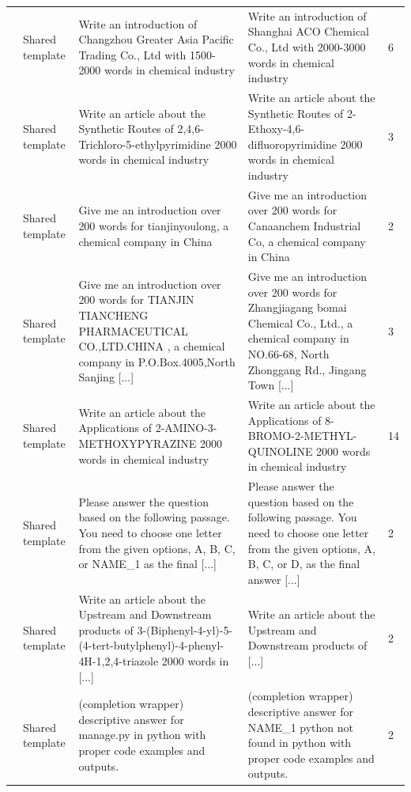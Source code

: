 {\begin{longtable}{@{}p{}p{}p{}p{}p{}@{}}
\addlinespace[3pt]
65 & Shared template & \raggedright Write an introduction of Changzhou Greater Asia Pacific Trading Co., Ltd with 1500-2000 words in chemical industry & \raggedright Write an introduction of Shanghai ACO Chemical Co., Ltd with 2000-3000 words in chemical industry & 6\\
\addlinespace[3pt]
81 & Shared template & \raggedright Write an article about the Synthetic Routes of 2,4,6-Trichloro-5-ethylpyrimidine 2000 words in chemical industry & \raggedright Write an article about the Synthetic Routes of 2-Ethoxy-4,6-difluoropyrimidine 2000 words in chemical industry & 3\\
\addlinespace[3pt]
133 & Shared template & \raggedright Give me an introduction over 200 words for tianjinyoulong, a chemical company in China & \raggedright Give me an introduction over 200 words for Canaanchem Industrial Co, a chemical company in China & 2\\
\addlinespace[3pt]
136 & Shared template & \raggedright Give me an introduction over 200 words for TIANJIN TIANCHENG PHARMACEUTICAL CO.,LTD.CHINA , a chemical company in P.O.Box.4005,North Sanjing [...] & \raggedright Give me an introduction over 200 words for Zhangjiagang bomai Chemical Co., Ltd., a chemical company in NO.66-68, North Zhonggang Rd., Jingang Town [...] & 3\\
\addlinespace[3pt]
149 & Shared template & \raggedright Write an article about the Applications of 2-AMINO-3-METHOXYPYRAZINE 2000 words in chemical industry & \raggedright Write an article about the Applications of 8-BROMO-2-METHYL-QUINOLINE 2000 words in chemical industry & 14\\
\addlinespace[3pt]
162 & Shared template & \raggedright Please answer the question based on the following passage. You need to choose one letter from the given options, A, B, C, or NAME\_1 as the final [...] & \raggedright Please answer the question based on the following passage. You need to choose one letter from the given options, A, B, C, or D, as the final answer [...] & 2\\
\addlinespace[3pt]
201 & Shared template & \raggedright Write an article about the Upstream and Downstream products of 3-(Biphenyl-4-yl)-5-(4-tert-butylphenyl)-4-phenyl-4H-1,2,4-triazole 2000 words in [...] & \raggedright Write an article about the Upstream and Downstream products of [...] & 2\\
\addlinespace[3pt]
226 & Shared template & \raggedright (completion wrapper) descriptive answer for manage.py in python with proper code examples and outputs. & \raggedright (completion wrapper) descriptive answer for NAME\_1 python not found in python with proper code examples and outputs. & 2\\

\end{longtable}}
